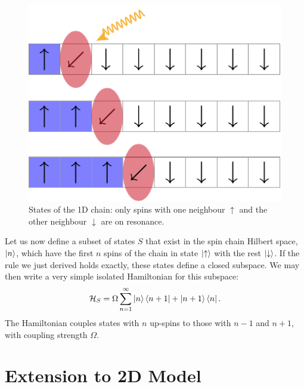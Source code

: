 \begin{figure}[htb]
  \begin{center}
    \includegraphics{figures/1D_spin_lattice.pdf}
  \end{center}
  \caption{States of the 1D chain: only spins with one neighbour $\uparrow$ and the other neighbour $\downarrow$ are on resonance.}
  \label{1D_spin_lattice}
\end{figure}

Let us now define a subset of states $S$ that exist in the spin chain Hilbert space, $\left\vert n\right\rangle$, which have the first $n$ spins of the chain in state $\left\vert\uparrow\right\rangle$ with the rest $\left\vert\downarrow\right\rangle$. If the rule we just derived holds exactly, these states define a closed subspace. We may then write a very simple isolated Hamiltonian for this subspace:
\begin{equation}
  {\cal H}_S = \Omega \sum_{n=1}^\infty \left\vert n\right\rangle\left\langle  n+1\right\vert+\left\vert n+1\right\rangle\left\langle  n\right\vert.
  \label{1d_ham}
\end{equation}
The Hamiltonian couples states with $n$ up-spins to those with $n-1$ and $n+1$, with coupling strength $\Omega$. 

\section{Extension to 2D Model}

